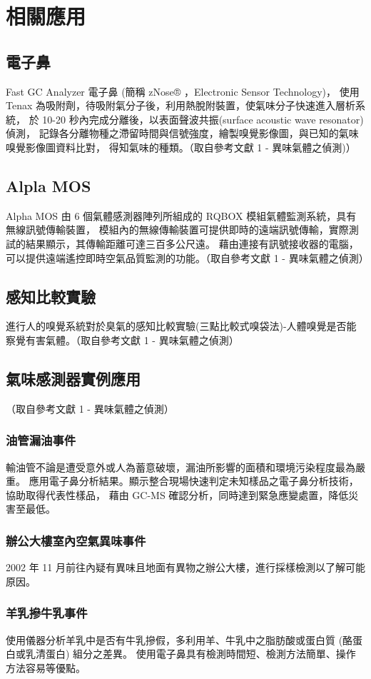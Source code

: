 \chapter{相關應用}

\section{電子鼻}
Fast GC Analyzer 電子鼻 (簡稱 zNose® ，Electronic Sensor Technology)，
使用 Tenax 為吸附劑，待吸附氣分子後，利用熱脫附裝置，使氣味分子快速進入層析系統，
於 10-20 秒內完成分離後，以表面聲波共振(surface acoustic wave resonator) 偵測，
記錄各分離物種之滯留時間與信號強度，繪製嗅覺影像圖，與已知的氣味嗅覺影像圖資料比對，
得知氣味的種類。（取自參考文獻 1 - 異味氣體之偵測)）

\section{Alpla MOS}
Alpha MOS 由 6 個氣體感測器陣列所組成的 RQBOX 模組氣體監測系統，具有無線訊號傳輸裝置，
模組內的無線傳輸裝置可提供即時的遠端訊號傳輸，實際測試的結果顯示，其傳輸距離可達三百多公尺遠。
藉由連接有訊號接收器的電腦，可以提供遠端遙控即時空氣品質監測的功能。（取自參考文獻 1 - 異味氣體之偵測）

\section{感知比較實驗}
進行人的嗅覺系統對於臭氣的感知比較實驗(三點比較式嗅袋法)-人體嗅覺是否能察覺有害氣體。（取自參考文獻 1 - 異味氣體之偵測）

\section{氣味感測器實例應用}
（取自參考文獻 1 - 異味氣體之偵測）\\
	\subsection{油管漏油事件}
	輸油管不論是遭受意外或人為蓄意破壞，漏油所影響的面積和環境污染程度最為嚴重。
	應用電子鼻分析結果。顯示整合現場快速判定未知樣品之電子鼻分析技術，協助取得代表性樣品，
	藉由 GC-MS 確認分析，同時達到緊急應變處置，降低災害至最低。
	\subsection{辦公大樓室內空氣異味事件}
	2002 年 11 月前往內疑有異味且地面有異物之辦公大樓，進行採樣檢測以了解可能原因。
	\subsection{羊乳摻牛乳事件}
	使用儀器分析羊乳中是否有牛乳摻假，多利用羊、牛乳中之脂肪酸或蛋白質 (酪蛋白或乳清蛋白) 組分之差異。
	使用電子鼻具有檢測時間短、檢測方法簡單、操作方法容易等優點。